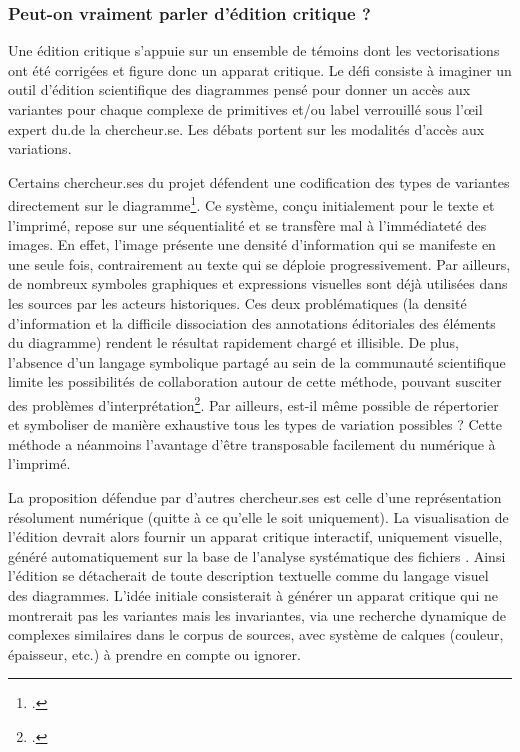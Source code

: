 \hypertarget{peut-on-vraiment-parler-dedition-critique}{%
\subsubsection{Peut-on vraiment parler d'édition critique
?}\label{peut-on-vraiment-parler-dedition-critique}}

Une édition critique s'appuie sur un ensemble de témoins dont les
vectorisations ont été corrigées et figure donc un apparat critique. Le
défi consiste à imaginer un outil d'édition scientifique des diagrammes
pensé pour donner un accès aux variantes pour chaque complexe de
primitives et/ou label verrouillé sous l'œil expert du.de la chercheur.se. Les
débats portent sur les modalités d'accès aux variations.

Certains chercheur.ses du projet défendent une codification des types de
variantes directement sur le diagramme\footcite[\enquote{Electronic tools such
  as DRaFT allow us to indicate editorial actions by altering the weight
  of solid lines or by using various forms of dashed lines.}][p.229]{de_young_editing_2014}. Ce
système, conçu initialement pour le texte et l'imprimé, repose sur une
séquentialité et se transfère mal à l'immédiateté des images. En effet,
l'image présente une densité d'information qui se manifeste en une seule
fois, contrairement au texte qui se déploie progressivement. Par
ailleurs, de nombreux symboles graphiques et expressions visuelles sont
déjà utilisées dans les sources par les acteurs historiques. Ces deux
problématiques (la densité d'information et la difficile dissociation des
annotations éditoriales des éléments du diagramme) rendent le résultat
rapidement chargé et illisible. De plus, l'absence d'un langage
symbolique partagé au sein de la communauté scientifique limite les
possibilités de collaboration autour de cette méthode, pouvant susciter
des problèmes d'interprétation\footcite[``Since there is as yet no
  strong consensus on how to indicate various forms of editor
  interference within diagrams, there is the potential for confusing or
  contradictory indicators to develop.''][p.229]{de_young_editing_2014}. Par
ailleurs, est-il même possible de répertorier et symboliser de manière
exhaustive tous les types de variation possibles ? Cette méthode a
néanmoins l'avantage d'être transposable facilement du numérique à
l'imprimé.

La proposition défendue par d'autres chercheur.ses est celle d'une
représentation résolument numérique (quitte à ce qu'elle le soit
uniquement). La visualisation de l'édition devrait alors fournir un
apparat critique interactif, uniquement visuelle, généré automatiquement
sur la base de l'analyse systématique des fichiers \svg. Ainsi l'édition
se détacherait de toute description textuelle comme du langage visuel
des diagrammes. L'idée initiale consisterait à générer un apparat critique
qui ne montrerait pas les variantes mais les invariantes, via une
recherche dynamique de complexes similaires dans le corpus de sources,
avec système de calques (couleur, épaisseur, etc.) à prendre en compte
ou ignorer.


